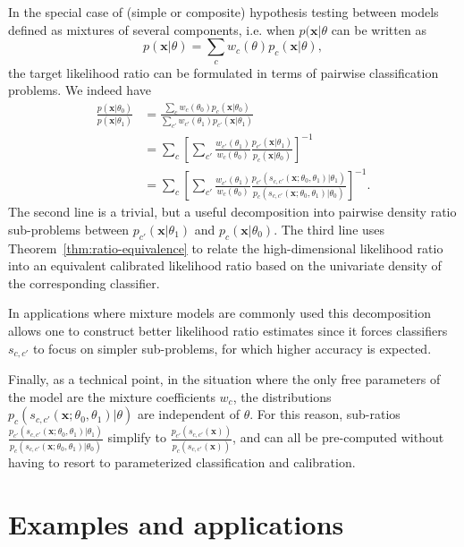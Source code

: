 \documentclass[12pt]{article}
\numberwithin{equation}{section}
\theoremstyle{plain}
\begin{document}
In the special case of (simple or composite) hypothesis testing between
models defined as mixtures of several components, i.e. when $p(\mathbf{x}|\theta$ can be written as
\begin{equation}
p(\mathbf{x}|\theta)=\sum_c w_c(\theta) p_c(\mathbf{x}| \theta),
\end{equation}
the target likelihood ratio can be formulated in terms of pairwise
classification problems. We indeed have
\begin{align}
\frac{p(\mathbf{x}|\theta_0)}{p(\mathbf{x}|\theta_1)} &= \frac{\sum_c w_c(\theta_0) p_c(\mathbf{x}| \theta_0)}{\sum_{c'} w_{c'}(\theta_1) p_{c'}(\mathbf{x}| \theta_1)} \nonumber \\
&= \sum_c \left[ \sum_{c'} \frac{ w_{c'}(\theta_1)}{w_c(\theta_0)} \frac{ p_{c'}(\mathbf{x}| \theta_1)}{  p_c(\mathbf{x}| \theta_0)}  \right]^{-1} \nonumber \\
&= \sum_c \left[ \sum_{c'} \frac{ w_{c'}(\theta_1)}{w_c(\theta_0)} \frac{ p_{c'}(s_{c,c'}(\mathbf{x};\theta_0, \theta_1)| \theta_1)}{ p_c(s_{c,c'}(\mathbf{x};\theta_0, \theta_1)| \theta_0)}  \right]^{-1}. \label{eq:decomposedResult}
\end{align}
The second line is a trivial, but a useful decomposition into pairwise
density ratio sub-problems between $p_{c'}(\mathbf{x}|\theta_1)$ and
$p_c(\mathbf{x}|\theta_0)$.  The third line uses
Theorem~\ref{thm:ratio-equivalence} to relate the high-dimensional likelihood
ratio into an equivalent calibrated likelihood ratio based on the univariate
density of the corresponding classifier.

In applications where mixture models are commonly used this decomposition allows
one to construct better likelihood ratio estimates since it forces classifiers
$s_{c,c'}$ to focus on simpler sub-problems, for which higher accuracy is
expected.

Finally, as a technical point, in the situation where the only free parameters
of the  model are the mixture coefficients $w_c$, the distributions
$p_{c}(s_{c,c'}(\mathbf{x};\theta_0, \theta_1)| \theta)$ are independent of
$\theta$. For this reason, sub-ratios $\frac{
p_{c'}(s_{c,c'}(\mathbf{x};\theta_0, \theta_1)|\theta_1)}{
p_c(s_{c,c'}(\mathbf{x};\theta_0, \theta_1)|\theta_0)}$ simplify to $\frac{
p_{c'}(s_{c,c'}(\mathbf{x}))}{ p_c(s_{c,c'}(\mathbf{x}))}$, and can all be
pre-computed without having to resort to parameterized classification and
calibration.



\section{Examples and applications}
\label{sec:examples}
\end{document}

